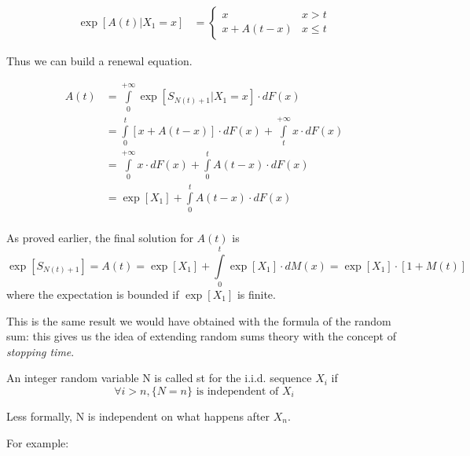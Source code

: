 \begin{equation}\begin{split}
	\exp[A(t)|X_1=x] &=
	\begin{cases}
		x & x>t \\
		x + A(t-x) & x \le t
	\end{cases}
\end{split} \end{equation}

Thus we can build a renewal equation.

\begin{equation} \begin{split}
	A(t) &= \int\limits_0^{+\infty} \exp[S_{N(t)+1}|X_1 = x] \cdot dF(x) \\
	&= \int\limits_0^{t} [x+ A(t-x)] \cdot dF(x) + \int\limits_t^{+\infty} x \cdot dF(x) \\
	&= \int\limits_0^{+\infty} x \cdot dF(x) + \int\limits_0^{t} A(t-x) \cdot dF(x) \\
	&= \exp[X_1] + \int\limits_0^{t} A(t-x) \cdot dF(x)\\
\end{split}\end{equation}

As proved earlier, the final solution for $A(t)$ is
$$ \exp[S_{N(t)+1}] = A(t) = \exp[X_1] + \int\limits_0^{t} \exp[X_1] \cdot dM(x) = \exp[X_1]\cdot [1+M(t)] $$
where the expectation is bounded if $\exp[X_1]$ is finite.

This is the same result we would have obtained with the formula of the random sum: this gives us the idea of extending random sums theory with the concept of \emph{stopping time}.

\begin{definition}
An integer random variable N is called \gls{st} for the i.i.d. sequence $X_i$ if
\begin{equation}
	\forall i > n, \{N=n\} \text{ is independent of }X_i
\end{equation}

Less formally, N is independent on what happens after $X_n$.
\end{definition}
For example:

